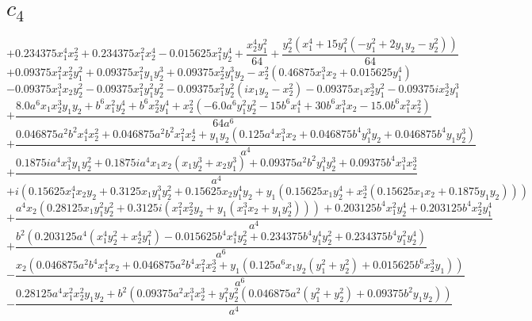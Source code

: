 \section{$c_4$}
$$+0.234375 x_{1}^{4} x_{2}^{2} + 0.234375 x_{1}^{2} x_{2}^{4} - 0.015625 x_{1}^{2} y_{2}^{4} + \frac{x_{2}^{4} y_{1}^{2}}{64} + \frac{y_{2}^{2} \left(x_{1}^{4} + 15 y_{1}^{2} \left(- y_{1}^{2} + 2 y_{1} y_{2} - y_{2}^{2}\right)\right)}{64}$$
$$+0.09375 x_{1}^{2} x_{2}^{2} y_{1}^{2} + 0.09375 x_{1}^{2} y_{1} y_{2}^{3} + 0.09375 x_{2}^{2} y_{1}^{3} y_{2} - x_{2}^{2} \left(0.46875 x_{1}^{3} x_{2} + 0.015625 y_{1}^{4}\right)$$
$$- 0.09375 x_{1}^{3} x_{2} y_{2}^{2} - 0.09375 x_{1}^{2} y_{1}^{2} y_{2}^{2} - 0.09375 x_{1}^{2} y_{2}^{2} \left(i x_{1} y_{2} - x_{2}^{2}\right) - 0.09375 x_{1} x_{2}^{3} y_{1}^{2} - 0.09375 i x_{2}^{3} y_{1}^{3}$$
$$+\frac{8.0 a^{6} x_{1} x_{2}^{3} y_{1} y_{2} + b^{6} x_{1}^{2} y_{2}^{4} + b^{6} x_{2}^{2} y_{1}^{4} + x_{2}^{2} \left(- 6.0 a^{6} y_{1}^{2} y_{2}^{2} - 15 b^{6} x_{1}^{4} + 30 b^{6} x_{1}^{3} x_{2} - 15.0 b^{6} x_{1}^{2} x_{2}^{2}\right)}{64 a^{6}}$$
$$+\frac{0.046875 a^{2} b^{2} x_{1}^{4} x_{2}^{2} + 0.046875 a^{2} b^{2} x_{1}^{2} x_{2}^{4} + y_{1} y_{2} \left(0.125 a^{4} x_{1}^{3} x_{2} + 0.046875 b^{4} y_{1}^{3} y_{2} + 0.046875 b^{4} y_{1} y_{2}^{3}\right)}{a^{4}}$$
$$+\frac{0.1875 i a^{4} x_{1}^{3} y_{1} y_{2}^{2} + 0.1875 i a^{4} x_{1} x_{2} \left(x_{1} y_{2}^{3} + x_{2} y_{1}^{3}\right) + 0.09375 a^{2} b^{2} y_{1}^{3} y_{2}^{3} + 0.09375 b^{4} x_{1}^{3} x_{2}^{3}}{a^{4}}$$
$$+i \left(0.15625 x_{1}^{4} x_{2} y_{2} + 0.3125 x_{1} y_{1}^{3} y_{2}^{2} + 0.15625 x_{2} y_{1}^{4} y_{2} + y_{1} \left(0.15625 x_{1} y_{2}^{4} + x_{2}^{3} \left(0.15625 x_{1} x_{2} + 0.1875 y_{1} y_{2}\right)\right)\right)$$
$$+\frac{a^{4} x_{2} \left(0.28125 x_{1} y_{1}^{2} y_{2}^{2} + 0.3125 i \left(x_{1}^{2} x_{2}^{2} y_{2} + y_{1} \left(x_{1}^{3} x_{2} + y_{1} y_{2}^{3}\right)\right)\right) + 0.203125 b^{4} x_{1}^{2} y_{2}^{4} + 0.203125 b^{4} x_{2}^{2} y_{1}^{4}}{a^{4}}$$
$$+\frac{b^{2} \left(0.203125 a^{4} \left(x_{1}^{4} y_{2}^{2} + x_{2}^{4} y_{1}^{2}\right) - 0.015625 b^{4} x_{1}^{4} y_{2}^{2} + 0.234375 b^{4} y_{1}^{4} y_{2}^{2} + 0.234375 b^{4} y_{1}^{2} y_{2}^{4}\right)}{a^{6}}$$
$$- \frac{x_{2} \left(0.046875 a^{2} b^{4} x_{1}^{4} x_{2} + 0.046875 a^{2} b^{4} x_{1}^{2} x_{2}^{3} + y_{1} \left(0.125 a^{6} x_{1} y_{2} \left(y_{1}^{2} + y_{2}^{2}\right) + 0.015625 b^{6} x_{2}^{3} y_{1}\right)\right)}{a^{6}}$$
$$- \frac{0.28125 a^{4} x_{1}^{2} x_{2}^{2} y_{1} y_{2} + b^{2} \left(0.09375 a^{2} x_{1}^{3} x_{2}^{3} + y_{1}^{2} y_{2}^{2} \left(0.046875 a^{2} \left(y_{1}^{2} + y_{2}^{2}\right) + 0.09375 b^{2} y_{1} y_{2}\right)\right)}{a^{4}}$$
